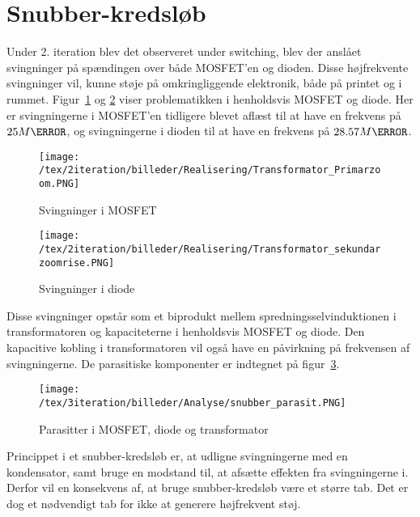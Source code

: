 
\section{Snubber-kredsløb}
Under 2. iteration blev det observeret under switching, blev der anslået svingninger på spændingen over både MOSFET'en og dioden. Disse højfrekvente svingninger vil, kunne støje på omkringliggende elektronik, både på printet og i rummet. Figur~\ref{fig:MOSFET_svingninger_2} og \ref{fig:diode_svingninger_2} viser problematikken i henholdsvis MOSFET og diode. Her er svingningerne i MOSFET'en tidligere blevet aflæst til at have en frekvens på $25M\hertz$, og svingningerne i dioden til at have en frekvens på $28.57M\hertz$. 

\begin{figure}[H]
	\center
	\texttt{[image: /tex/2iteration/billeder/Realisering/Transformator\_Primarzoom.PNG]}
	\caption{Svingninger i MOSFET}
	\label{fig:MOSFET_svingninger_2}
\end{figure}

\begin{figure}[H]
	\center
	\texttt{[image: /tex/2iteration/billeder/Realisering/Transformator\_sekundarzoomrise.PNG]}
	\caption{Svingninger i diode}
	\label{fig:diode_svingninger_2}
\end{figure}


Disse svingninger opstår som et biprodukt mellem spredningsselvinduktionen i transformatoren og kapaciteterne i henholdsvis MOSFET og diode. Den kapacitive kobling i transformatoren vil også have en påvirkning på frekvensen af svingningerne. De parasitiske komponenter er indtegnet på figur~\ref{fig:snubber_parasit}\cite{snubber_parasit}.  

\begin{figure}[H]
	\center
	\texttt{[image: /tex/3iteration/billeder/Analyse/snubber\_parasit.PNG]}
	\caption{Parasitter i MOSFET, diode og transformator}
	\label{fig:snubber_parasit}
\end{figure}

Princippet i et snubber-kredsløb er, at udligne svingningerne med en kondensator, samt bruge en modstand til, at afsætte effekten fra svingningerne i. Derfor vil en konsekvens af, at bruge snubber-kredsløb være et større tab. Det er dog et nødvendigt tab for ikke at generere højfrekvent støj. 

